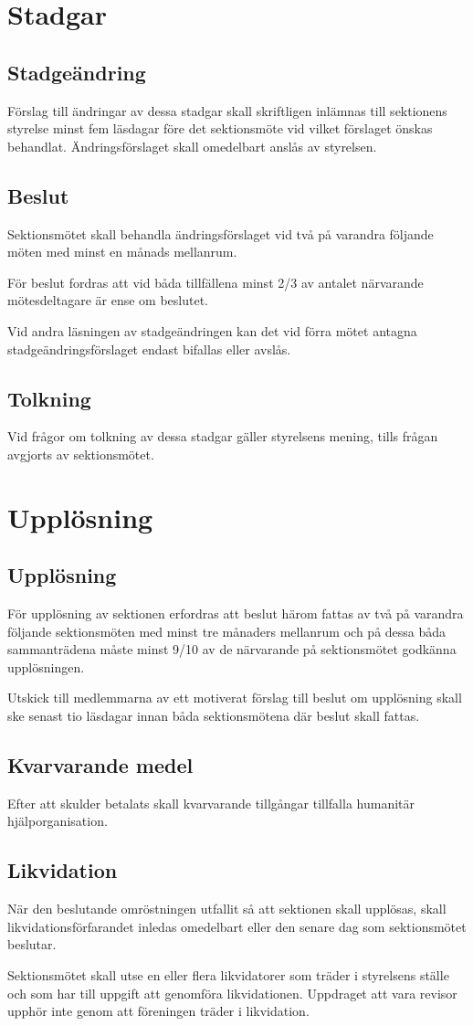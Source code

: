 \documentclass{datateknologsektionen-document}
\begin{document}
  \section{Stadgar}
    \subsection{Stadgeändring}
      Förslag till ändringar av dessa stadgar skall skriftligen inlämnas till sektionens styrelse
      minst fem läsdagar före det sektionsmöte vid vilket förslaget önskas behandlat.
      Ändringsförslaget skall omedelbart anslås av styrelsen.
    \subsection{Beslut}
      Sektionsmötet skall behandla ändringsförslaget vid två på varandra följande möten med
      minst en månads mellanrum.

      För beslut fordras att vid båda tillfällena minst 2/3 av antalet närvarande mötesdeltagare
      är ense om beslutet.

      Vid andra läsningen av stadgeändringen kan det vid förra mötet antagna
      stadgeändringsförslaget endast bifallas eller avslås.
    \subsection{Tolkning}
      Vid frågor om tolkning av dessa stadgar gäller styrelsens mening, tills frågan avgjorts av
      sektionsmötet.
  \section{Upplösning}
    \subsection{Upplösning}
      För upplösning av sektionen erfordras att beslut härom fattas av två på varandra följande
      sektionsmöten med minst tre månaders mellanrum och på dessa båda sammanträdena
      måste minst 9/10 av de närvarande på sektionsmötet godkänna upplösningen.

      Utskick till medlemmarna av ett motiverat förslag till beslut om upplösning skall ske
      senast tio läsdagar innan båda sektionsmötena där beslut skall fattas.
    \subsection{Kvarvarande medel}
      Efter att skulder betalats skall kvarvarande tillgångar tillfalla humanitär
      hjälporganisation.
    \subsection{Likvidation}
      När den beslutande omröstningen utfallit så att sektionen skall upplösas, skall
      likvidationsförfarandet inledas omedelbart eller den senare dag som sektionsmötet
      beslutar.

      Sektionsmötet skall utse en eller flera likvidatorer som träder i styrelsens ställe och som
      har till uppgift att genomföra likvidationen. Uppdraget att vara revisor upphör inte genom
      att föreningen träder i likvidation. 
\end{document}
